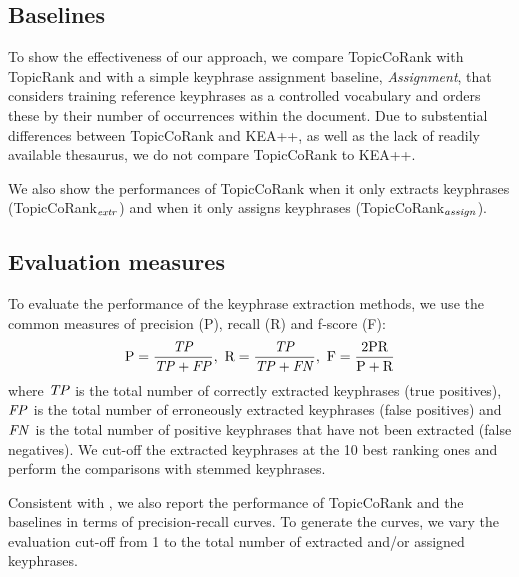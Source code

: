   \subsection{Baselines}
  \label{subsec:baselines}
    To show the effectiveness of our approach, we
    compare TopicCoRank with TopicRank and with a simple keyphrase assignment baseline,
    \textit{Assignment}, that considers training reference keyphrases as a
    controlled vocabulary and orders these by their number of occurrences within
    the document. Due to substential differences between TopicCoRank and KEA++, as
    well as the lack of readily available thesaurus, we do not compare
    TopicCoRank to KEA++.

    We also show the performances of TopicCoRank when it only extracts keyphrases
    (TopicCoRank$_\textnormal{\textit{extr}}$) and when it only assigns keyphrases
    (TopicCoRank$_\textnormal{\textit{assign}}$).
  \subsection{Evaluation measures}
  \label{subsec:evaluation_measures}
    To evaluate the performance of the keyphrase extraction methods, we use the
    common measures of precision (P), recall (R) and f-score (F):
    \begin{align}
        \text{P} = \frac{\text{\textit{TP}}}{\text{\textit{TP}}+\text{\textit{FP}}},\ \text{R} = \frac{\text{\textit{TP}}}{\text{\textit{TP}} + \text{\textit{FN}}},\ \text{F} = \frac{2 \text{PR}}{\text{P} + \text{R}}
    \end{align}
    where $\textnormal{\textit{TP}}$ is the total number of correctly extracted keyphrases (true positives),
    $\textnormal{\textit{FP}}$ is the total number of erroneously extracted keyphrases (false positives) and
    $\textnormal{\textit{FN}}$ is the total number of positive keyphrases that have not been extracted (false negatives).
    We cut-off the extracted keyphrases at the 10 best ranking ones and perform the
    comparisons with stemmed keyphrases.
    
    Consistent with , we also report the performance of
    TopicCoRank and the baselines in terms of precision-recall curves. To generate the
    curves, we vary the evaluation cut-off from 1 to the total number of extracted and/or
    assigned keyphrases.

